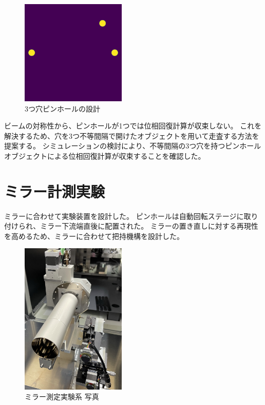 \documentclass[a4j]{jarticle}
\begin{document}
\begin{figure}[!ht]
\centering
\includegraphics[width=5cm]{../thesis/chap3/figure/three_pinhole_mask.png}
\caption{3つ穴ピンホールの設計}
\label{fig:transverse_schematic}
\end{figure}

ビームの対称性から、ピンホールが1つでは位相回復計算が収束しない。
これを解決するため、穴を3つ不等間隔で開けたオブジェクトを用いて走査する方法を提案する。
シミュレーションの検討により、不等間隔の3つ穴を持つピンホールオブジェクトによる位相回復計算が収束することを確認した。

\section{ミラー計測実験}

ミラーに合わせて実験装置を設計した。
ピンホールは自動回転ステージに取り付けられ、ミラー下流端直後に配置された。
ミラーの置き直しに対する再現性を高めるため、ミラーに合わせて把持機構を設計した。

\begin{figure}[!ht]
\centering
\includegraphics[width=5cm]{../thesis/chap5/figure/photo_mirror_pinhole.png}
\caption{ミラー測定実験系 写真}
\label{fig:photo_mirror_experiment_mirror_and_pinhole}
\end{figure}
\end{document}
